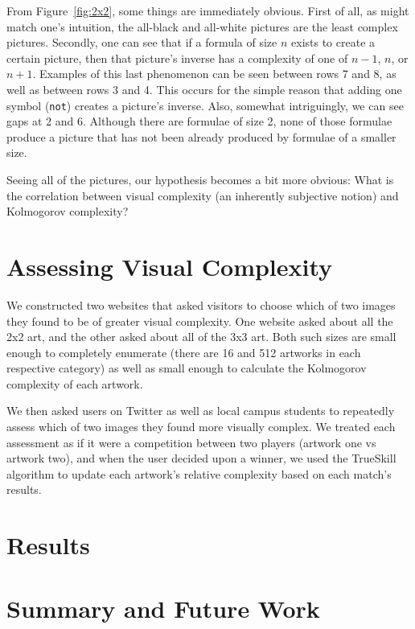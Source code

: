 \documentclass[11pt]{article}
\begin{document}
From Figure~\ref{fig:2x2}, some things are immediately obvious.  First of all,
as might match one's intuition, the all-black and all-white pictures are the
least complex pictures.  Secondly, one can see that if a formula of size $n$
exists to create a certain picture, then that picture's inverse has a
complexity of one of $n-1$, $n$, or $n+1$.  Examples of this last phenomenon
can be seen between rows 7 and 8, as well as between rows 3 and 4.  This occurs
for the simple reason that adding one symbol ({\tt not}) creates a picture's
inverse.  Also, somewhat intriguingly, we can see gaps at 2 and 6.  Although
there are formulae of size 2, none of those formulae produce a picture that has
not been already produced by formulae of a smaller size.

Seeing all of the pictures, our hypothesis becomes a bit more obvious: What is
the correlation between visual complexity (an inherently subjective notion) and
Kolmogorov complexity?  

\section{Assessing Visual Complexity}

We constructed two websites that asked visitors to choose which of two images
they found to be of greater visual complexity.  One website asked about all the
2x2 art, and the other asked about all of the 3x3 art.  Both such sizes are
small enough to completely enumerate (there are 16 and 512 artworks in each
respective category) as well as small enough to calculate the Kolmogorov
complexity of each artwork.

We then asked users on Twitter as well as local campus students to repeatedly
assess which of two images they found more visually complex.  We treated each
assessment as if it were a competition between two players (artwork one vs
artwork two), and when the user decided upon a winner, we used the TrueSkill
algorithm to update each artwork's relative complexity based on each match's
results.

\section{Results}


\section{Summary and Future Work}
\end{document}
